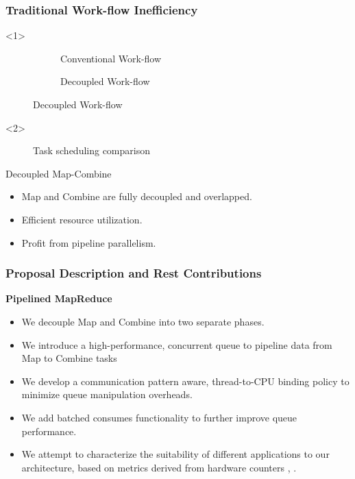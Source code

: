 \begin{frame}
	\frametitle{Traditional Work-flow Inefficiency}
	\begin{onlyenv}
	\begin{figure}[h]
		\begin{subfigure}{\textwidth}
			\caption{Conventional Work-flow}
		\end{subfigure}
		\par\vspace{15pt}
		\begin{subfigure}{\textwidth}
			\caption{Decoupled Work-flow}
		\end{subfigure}
	\end{figure}
	\end{onlyenv}
	\begin{onlyenv}
		
	\begin{figure}[h]
			\centering
			\caption*{Task scheduling comparison}
	\end{figure}
	\end{onlyenv}
	\begin{block}{Decoupled Map-Combine}
		\begin{itemize}
			\item Map and Combine are fully decoupled and overlapped.
			\item Efficient resource utilization.
			\item Profit from pipeline parallelism.
		\end{itemize}
	\end{block}
\end{frame}




\begin{frame}
	\frametitle{Proposal Description and Rest Contributions}
	\centerline{\textbf{Pipelined MapReduce}}
	\begin{itemize}
		\item We decouple Map and Combine into two separate phases.
		\item We introduce a high-performance, concurrent queue to pipeline data from Map to Combine tasks
		\item We develop a communication pattern aware, thread-to-CPU binding policy to minimize queue manipulation overheads.
		\item We add batched consumes functionality to further improve queue performance.
		\item We attempt to characterize the suitability of different applications to our architecture, based on metrics derived from hardware counters , .
	\end{itemize}
\end{frame}
